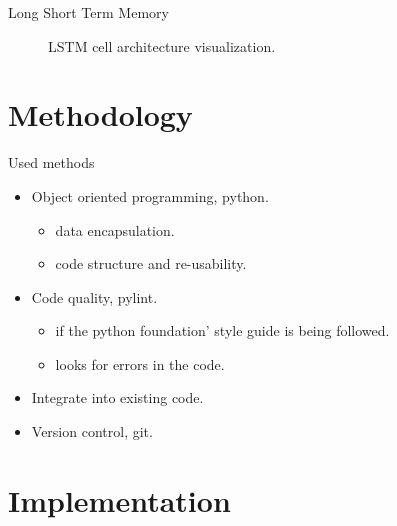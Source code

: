 \documentclass{beamer}
\begin{document}
\begin{frame}{Long Short Term Memory}
	\begin{figure}
		\caption{LSTM cell architecture visualization.}
	\end{figure}
\end{frame}


\section{Methodology}
\begin{frame}{Used methods}
	\begin{itemize}
		\item Object oriented programming, python.
			\begin{itemize}
				\item data encapsulation.
				\item code structure and re-usability.
			\end{itemize}
		\item Code quality, pylint.
			\begin{itemize}
				\item if the python foundation' style guide is being followed.
				\item looks for errors in the code.
			\end{itemize}
		\item Integrate into existing code.
		\item Version control, git.
	\end{itemize}
\end{frame}

\section{Implementation}
\end{document}
